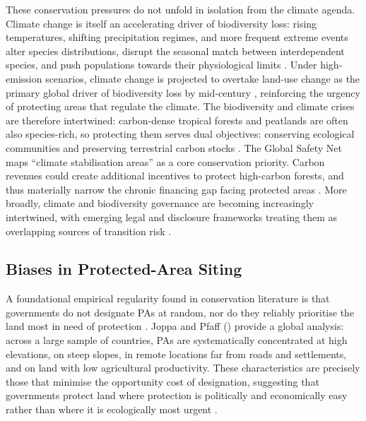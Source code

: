 \documentclass[12pt]{article}
\theoremstyle{break}
\begin{document}
These conservation pressures do not unfold in isolation from the climate agenda.
Climate change is itself an accelerating driver of biodiversity loss: rising temperatures,
shifting precipitation regimes, and more frequent extreme events alter species distributions,
disrupt the seasonal match between interdependent species, and push populations towards 
their physiological limits \citep{thomas2004, urban2015, ipbesipcc2021}.
Under high-emission scenarios, climate change is projected to overtake land-use change
as the primary global driver of biodiversity loss by mid-century \citep{ipbesipcc2021},
reinforcing the urgency of protecting areas that regulate the climate.
The biodiversity and climate crises are therefore intertwined: carbon-dense
tropical forests and peatlands are often also species-rich, so protecting them
serves dual objectives: conserving ecological communities and preserving terrestrial
carbon stocks \citep{ipcc2019srccl}. The Global Safety Net \citep{dinerstein2020}
maps ``climate stabilisation areas'' as a core conservation priority. Carbon revenues could create additional
incentives to protect high-carbon forests, and thus materially narrow the
chronic financing gap facing protected areas \citep{koh2021}. More broadly, climate
and biodiversity governance are becoming increasingly intertwined, with emerging legal
and disclosure frameworks treating them as overlapping sources of transition risk
\citep{boran2024, govind2025}.

\subsection{Biases in Protected-Area Siting}
\label{sec:lit_siting}

A foundational empirical regularity found in conservation literature is that governments
do not designate PAs at random, nor do they reliably prioritise the land most in need
of protection \citep{joppa2009, venter2018, baldi2017}.
Joppa and Pfaff (\citeyear{joppa2009}) provide a global
analysis: across a large sample of countries, PAs are systematically concentrated at
high elevations, on steep slopes, in remote locations far from roads and settlements,
and on land with low agricultural productivity. These characteristics are precisely
those that minimise the opportunity cost of designation, suggesting that governments
protect land where protection is politically and economically easy rather than where
it is ecologically most urgent \citep{venter2018}.
\end{document}

